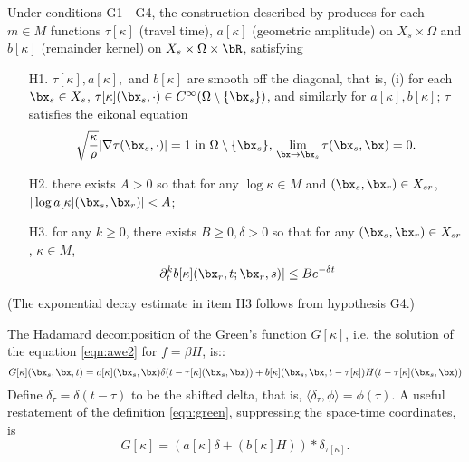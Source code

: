 Under conditions G1 - G4, the construction described by
\cite{Friedlander:75} produces for each $m \in M$ functions $\tau[\kappa]$ (travel time), $a[\kappa]$
(geometric amplitude) on $X_s \times \Omega$ and $b[\kappa]$
(remainder kernel) on $X_s \times \Omega \times \bR$, satisfying
\begin{itemize}
\item[H1. ] $\tau[\kappa], a[\kappa],$ and $b[\kappa]$ are smooth off the diagonal,
  that is,
  (i) for each $\bx_s \in X_s$, $\tau[\kappa](\bx_s,\cdot) \in C^{\infty}(\Omega \setminus
  \{\bx_s\})$, and similarly for $a[\kappa],b[\kappa]$; $\tau$
  satisfies the eikonal equation
  \[
    \sqrt{\frac{\kappa}{\rho}} |\nabla \tau(\bx_s,\cdot)| = 1 \mbox{ in } \Omega \setminus
    \{\bx_s\}, \, \lim_{\bx \rightarrow \bx_s} \tau(\bx_s,\bx) = 0.
  \]
\item[H2. ] there exists $A>0$ so that for any $\log \kappa \in M$
  and $(\bx_s,\bx_r) \in X_{sr}$,
  $|\log a[\kappa](\bx_s,\bx_r)| < A$;
\item[H3. ] for any $k \ge 0$, there exists $B \ge 0,\delta > 0$ so
  that for any $(\bx_s,\bx_r) \in X_{sr}$, $\kappa \in M$, 
\begin{equation}
  |\partial^k_t b[\kappa](\bx_r,t;\bx_r,s)| \le B e^{-\delta t}
  \label{eqn:best}
\end{equation}
\end{itemize}
(The exponential decay estimate in item H3 follows from hypothesis G4.)

The Hadamard
decomposition of the Green's function $G[\kappa]$, i.e. the solution of the
equation \ref{eqn:awe2} for $f = \beta H$, is::
\begin{equation}
  \label{eqn:green}
  G[\kappa](\bx_s,\bx,t) = a[\kappa](\bx_s,\bx)\delta(t - \tau[\kappa](\bx_s,\bx)) +
  b[\kappa](\bx_s,\bx,t-\tau[\kappa])H(t - \tau[\kappa](\bx_s,\bx))
\end{equation}
Define $\delta_{\tau} = \delta(t-\tau)$ to be the shifted delta, that
is, $\langle \delta_{\tau},\phi\rangle = \phi(\tau)$. A useful
restatement of the definition \ref{eqn:green}, suppressing the
space-time coordinates, is
\begin{equation}
  \label{eqn:regreen}
  G[\kappa] = (a[\kappa]\delta +  (b[\kappa]H))*\delta_{\tau[\kappa]}.
\end{equation}


